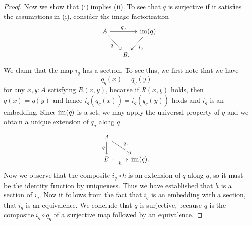 \begin{proof}
  Now we show that (i) implies (ii). To see that $q$ is surjective if it satisfies the assumptions in (i), consider the image factorization
  \begin{equation*}
    \begin{tikzcd}[column sep=tiny]
      A \arrow[dr,swap,"q"] \arrow[rr,"q_q"] & & \im(q) \arrow[dl,"i_q"] \\
      \phantom{\im(q)} & B.
    \end{tikzcd}
  \end{equation*}
  We claim that the map $i_q$ has a section. To see this, we first note that we have
  \begin{equation*}
    q_q(x)=q_q(y)
  \end{equation*}
  for any $x,y:A$ satisfying $R(x,y)$, because if $R(x,y)$ holds, then $q(x)=q(y)$ and hence $i_q(q_q(x))=i_q(q_q(y))$ holds and $i_q$ is an embedding. Since $\operatorname{im}(q)$ is a set, we may apply the universal property of $q$ and we obtain a unique extension of $q_q$ along $q$
  \begin{equation*}
    \begin{tikzcd}
      A \arrow[d,swap,"q"] \arrow[dr,"q_q"] \\
      B \arrow[r,densely dotted,swap,"h"] & \im(q).
    \end{tikzcd}
  \end{equation*}
  Now we observe that the composite $i_q\circ h$ is an extension of $q$ along $q$, so it must be the identity function by uniqueness. Thus we have established that $h$ is a section of $i_q$. Now it follows from the fact that $i_q$ is an embedding with a section, that $i_q$ is an equivalence. We conclude that $q$ is surjective, because $q$ is the composite $i_q\circ q_q$ of a surjective map followed by an equivalence.


\end{proof}
